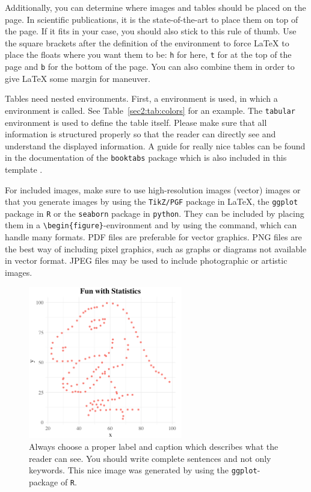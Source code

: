 \documentclass[
    language=english, %
    thesis=bachelor, %
    supervisor=postdoc, %
    multiauthor=false, %
    ]{settings/csssa-thesis}
\begin{document}
Additionally, you can determine where images and tables should be placed on the page. In scientific publications, it is the state-of-the-art to place them on top of the page. If it fits in your case, you should also stick to this rule of thumb. Use the square brackets after the definition of the environment to force \LaTeX{} to place the floats where you want them to be: \texttt{h} for here, \texttt{t} for at the top of the page and \texttt{b} for the bottom of the page. You can also combine them in order to give \LaTeX{} some margin for maneuver.

Tables need nested environments. First, a  environment is used, in which a  environment is called. See Table~\ref{sec2:tab:colors} for an example. The \texttt{tabular} environment is used to define the table itself. Please make sure that all information is structured properly so that the reader can directly see and understand the displayed information. A guide for really nice tables can be found in the documentation of the \texttt{booktabs} package which is also included in this template \citep{Fear2020booktabs}.


For included images, make sure to use high-resolution images (vector) images or that you generate images by using the \texttt{TikZ/PGF} package in \LaTeX, the \texttt{ggplot} package in \texttt{R} or the \texttt{seaborn} package in \texttt{python}. They can be included by placing them in a \verb|\begin{figure}|-environment and by using the  command, which can handle many formats. PDF files are preferable for vector graphics.  PNG files are the best way of including pixel graphics, such as graphs or diagrams not available in vector format.  JPEG files may be used to include photographic or artistic images.

\begin{figure}[ht]
    \centering
    \includegraphics[width=0.6\textwidth]{figures/dummy_figure.png}
    \caption{Always choose a proper label and caption which describes what the reader can see. You should write complete sentences and not only keywords. This nice image was generated by using the \texttt{ggplot}-package of \texttt{R}.}\label{fig:my_label}
\end{figure}
\end{document}
